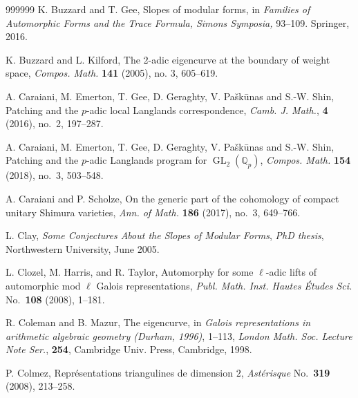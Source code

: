 \documentclass[12pt]{amsart}
\theoremstyle{definition}
\numberwithin{equation}{subsection}
\def\QQ{\mathbb{Q}}
\DeclareMathOperator{\GL}{GL}
\begin{document}
\begin{thebibliography}{999999}
K. Buzzard and T. Gee,
Slopes of modular forms, in {\it Families of Automorphic Forms and the Trace Formula, Simons Symposia,} 93--109. Springer, 2016.

K. Buzzard and L. Kilford,
The 2-adic eigencurve at the boundary of weight space,
{\it Compos. Math.} {\bf 141} (2005), no. 3, 605--619.




A. Caraiani, M. Emerton, T. Gee, D. Geraghty, V. Pa\v sk\= unas and S.-W. Shin, Patching and the $p$-adic local Langlands correspondence, {\it Camb. J.  Math.}, {\bf 4} (2016), no.~2, 197--287.

A. Caraiani, M. Emerton, T. Gee, D. Geraghty, V. Pa\v sk\= unas and S.-W. Shin,
Patching and the $p$-adic Langlands program for $\GL_2(\QQ_p)$, {\it	Compos. Math.} {\bf  154} (2018), no.~3, 503--548.

A. Caraiani and P. Scholze, 
On the generic part of the cohomology of compact unitary Shimura varieties, {\it Ann. of Math.} {\bf 186} (2017), no.~3, 649--766.


L. Clay, {\it Some Conjectures About the Slopes of Modular Forms}, {\it
PhD thesis}, Northwestern University, June 2005.

L. Clozel, M. Harris, and R. Taylor, Automorphy for some $\ell$-adic lifts of automorphic mod $\ell$ Galois representations, {\it Publ. Math. Inst. Hautes \'Etudes Sci.}  No.~{\bf 108} (2008), 1--181.


R. Coleman and B. Mazur,
The eigencurve, in {\it Galois representations in arithmetic algebraic geometry (Durham, 1996)}, 1--113,
{\it London Math. Soc. Lecture Note Ser.}, {\bf 254}, Cambridge Univ. Press, Cambridge, 1998.

P. Colmez, 
Repr\'esentations triangulines de dimension $2$, {\it Ast\'erisque} No.~{\bf 319} (2008), 213--258.


\end{thebibliography}
\end{document}
